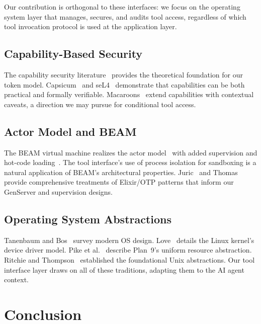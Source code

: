 \documentclass[12pt,a4paper]{article}
\theoremstyle{plain}
\theoremstyle{definition}
\begin{document}
Our contribution is orthogonal to these interfaces: we focus on the operating system layer that manages, secures, and audits tool access, regardless of which tool invocation protocol is used at the application layer.

\subsection{Capability-Based Security}

The capability security literature~\citep{dennis1966capabilities,levy1984capability,miller2003capability} provides the theoretical foundation for our token model. Capsicum~\citep{watson2010capsicum} and seL4~\citep{klein2009sel4} demonstrate that capabilities can be both practical and formally verifiable. Macaroons~\citep{birgisson2014macaroons} extend capabilities with contextual caveats, a direction we may pursue for conditional tool access.

\subsection{Actor Model and BEAM}

The BEAM virtual machine realizes the actor model~\citep{hewitt1973actors} with added supervision and hot-code loading~\citep{armstrong2003erlang}. The tool interface's use of process isolation for sandboxing is a natural application of BEAM's architectural properties. Juric~\citep{juric2019elixir} and Thomas~\citep{thomas2018elixir} provide comprehensive treatments of Elixir/OTP patterns that inform our GenServer and supervision designs.

\subsection{Operating System Abstractions}

Tanenbaum and Bos~\citep{tanenbaum2014modern} survey modern OS design. Love~\citep{love2010linux} details the Linux kernel's device driver model. Pike et al.~\citep{pike1995plan9} describe Plan~9's uniform resource abstraction. Ritchie and Thompson~\citep{ritchie1978unix} established the foundational Unix abstractions. Our tool interface layer draws on all of these traditions, adapting them to the AI agent context.


\section{Conclusion}
\label{sec:conclusion}
\end{document}
